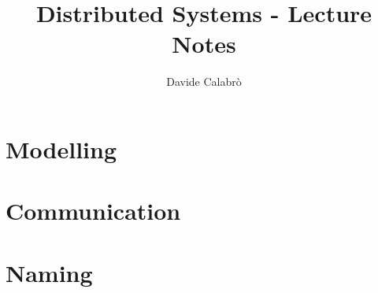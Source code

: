 \documentclass{article}
\title{Distributed Systems - Lecture Notes}
\author{Davide Calabrò}
\begin{document}
    \maketitle
    \newpage
    
    \tableofcontents
    
    \newpage

    \section{Modelling}
    
    
    \newpage
    
    \section{Communication}
    
    
    \newpage
    
    \section{Naming}
    
\end{document}
